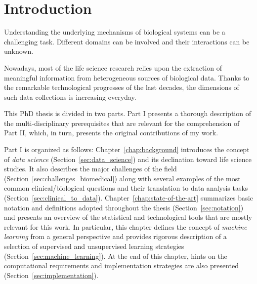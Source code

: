 
\chapter{Introduction} \label{chapter:introduction}
Understanding the underlying mechanisms of biological systems can be a challenging task. Different domains can be involved and their interactions can be unknown.

Nowadays, most of the life science research relies upon the extraction of meaningful information from heterogeneous sources of biological data. Thanks to the remarkable technological progresses of the last decades, the dimensions of such data collections is increasing everyday. 





This PhD thesis is divided in two parts. Part I presents a thorough description of the multi-disciplinary prerequisites that are relevant for the comprehension of Part II, which, in turn, presents the original contributions of my work.

Part I is organized as follows: Chapter~\ref{chap:background} introduces the concept of \textit{data science} (Section~\ref{sec:data_science}) and its declination toward life science studies. It also describes the major challenges of the field (Section~\ref{sec:challenges_biomedical}) along with several examples of the most common clinical/biological questions and their translation to data analysis tasks (Section~\ref{sec:clinical_to_data}).
Chapter~\ref{chap:state-of-the-art} summarizes basic notation and definitions adopted throughout the thesis (Section~\ref{sec:notation}) and presents an overview of the statistical and technological tools that are mostly relevant for this work. In particular, this chapter defines the concept of \textit{machine learning} from a general perspective and provides rigorous description of a selection of supervised and unsupervised learning strategies (Section~\ref{sec:machine_learning}). At the end of this chapter, hints on the computational requirements and implementation strategies are also presented (Section~\ref{sec:implementation}).

